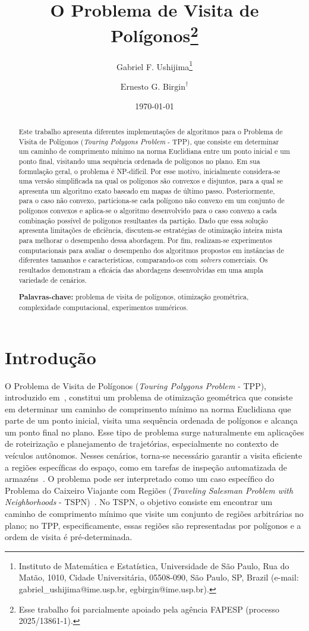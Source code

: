 \documentclass[11pt]{article}
\title{\textbf{O Problema de Visita de Polígonos}\thanks{Esse trabalho foi parcialmente apoiado pela agência FAPESP (processo 2025/13861-1).}}
\author{
	Gabriel F. Ushijima\thanks{Instituto de Matemática e Estatística, Universidade de São Paulo, Rua do Matão, 1010, Cidade Universitária,
05508-090, São Paulo, SP, Brazil (e-mail: gabriel\_ushijima@ime.usp.br, egbirgin@ime.usp.br).\vspace{0.5cm}}
	\and
	\(\text{Ernesto G. Birgin}^\dagger\)
}
\date{\today}
\begin{document}
\maketitle

\begin{abstract}

Este trabalho apresenta diferentes implementações de algoritmos para o Problema de Visita de Polígonos (\textit{Touring Polygons Problem} - TPP), que consiste em determinar um caminho de comprimento mínimo na norma Euclidiana entre um ponto inicial e um ponto final, visitando uma sequência ordenada de polígonos no plano. Em sua formulação geral, o problema é NP-difícil. Por esse motivo, inicialmente considera-se uma versão simplificada na qual os polígonos são convexos e disjuntos, para a qual se apresenta um algoritmo exato baseado em mapas de último passo. Posteriormente, para o caso não convexo, particiona-se cada polígono não convexo em um conjunto de polígonos convexos e aplica-se o algoritmo desenvolvido para o caso convexo a cada combinação possível de polígonos resultantes da partição. Dado que essa solução apresenta limitações de eficiência, discutem-se estratégias de otimização inteira mista para melhorar o desempenho dessa abordagem. Por fim, realizam-se experimentos computacionais para avaliar o desempenho dos algoritmos propostos em instâncias de diferentes tamanhos e características, comparando-os com \textit{solvers} comerciais. Os resultados demonstram a eficácia das abordagens desenvolvidas em uma ampla variedade de cenários.

\vspace{10pt}

\noindent \textbf{Palavras-chave:} problema de visita de polígonos, otimização geométrica, complexidade computacional, experimentos numéricos.
\end{abstract}


\section{Introdução}

O Problema de Visita de Polígonos (\textit{Touring Polygons Problem} - TPP), introduzido em~\cite{tpp-dror2003}, constitui um problema de otimização geométrica que consiste em determinar um caminho de comprimento mínimo na norma Euclidiana que parte de um ponto inicial, visita uma sequência ordenada de polígonos e alcança um ponto final no plano. Esse tipo de problema surge naturalmente em aplicações de roteirização e planejamento de trajetórias, especialmente no contexto de veículos autônomos. Nesses cenários, torna-se necessário garantir a visita eficiente a regiões específicas do espaço, como em tarefas de inspeção automatizada de armazéns~\cite{jianxian2023, karl2009}. O problema pode ser interpretado como um caso específico do Problema do Caixeiro Viajante com Regiões (\textit{Traveling Salesman Problem with Neighborhoods} - TSPN)~\cite{tspn-arkin2005}. No TSPN, o objetivo consiste em encontrar um caminho de comprimento mínimo que visite um conjunto de regiões arbitrárias no plano; no TPP, especificamente, essas regiões são representadas por polígonos e a ordem de visita é pré-determinada.
\end{document}
